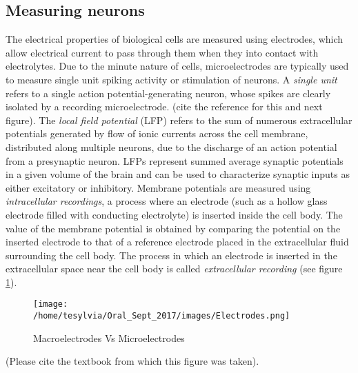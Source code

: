 \subsection{Measuring neurons}
The electrical properties of biological cells are measured using electrodes, which allow electrical current to pass through them when they into contact with 
electrolytes. Due to the minute nature of cells, microelectrodes are typically used to measure single unit spiking activity or stimulation of neurons.
A \textit{single unit} refers to a single action potential-generating neuron, whose spikes are clearly isolated by a recording microelectrode. (cite the reference for this and next figure).
The \textit{local field potential} (LFP) refers to the sum of numerous extracellular potentials generated by flow of ionic currents across the cell membrane, distributed along multiple neurons, due to the discharge of an action potential from a presynaptic neuron. LFPs represent summed average synaptic potentials in a given volume of the brain and can be used to characterize synaptic inputs as either excitatory or inhibitory.
Membrane potentials are measured using \textit{intracellular recordings}, a process where an electrode (such as a hollow glass electrode filled with conducting electrolyte) is inserted inside the cell body. The value of the membrane potential is obtained by comparing the potential on the inserted electrode to that of a reference electrode placed in the extracellular fluid surrounding the cell body.  The process in which an electrode is inserted in the extracellular space near the cell body is called \textit{extracellular recording} (see figure  \ref{fig:Electrodes}).

\begin{figure}[h!]
\caption{Macroelectrodes Vs Microelectrodes}
\texttt{[image: /home/tesylvia/Oral\_Sept\_2017/images/Electrodes.png]}
      \label{fig:Electrodes}
\end{figure}
(Please cite the textbook from which this figure was taken).\\

